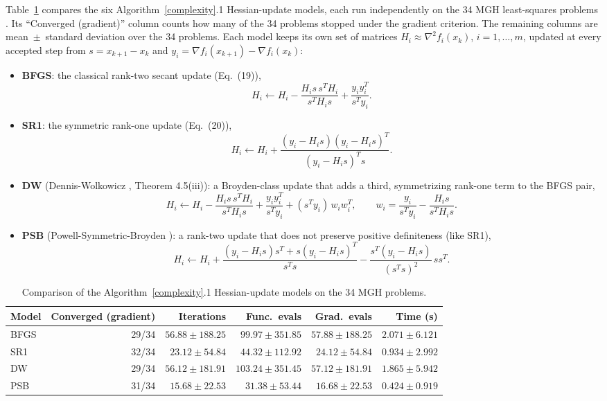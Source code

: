 \documentclass{article}
\begin{document}
Table~\ref{tab:hessian-models} compares the six Algorithm~\ref{complexity}.1 Hessian-update
models, each run independently on the 34 MGH least-squares problems
\cite{MoreGarbowHillstrom1981}. Its ``Converged (gradient)'' column counts
how many of the 34 problems stopped under the gradient criterion. The
remaining columns are mean~$\pm$~standard deviation over the 34 problems.
Each model keeps its own set of matrices $H_i \approx \nabla^2 f_i(x_k)$,
$i=1,\ldots,m$, updated at every accepted step from $s = x_{k+1}-x_k$ and
$y_i = \nabla f_i(x_{k+1}) - \nabla f_i(x_k)$:
\begin{itemize}
	\item \textbf{BFGS}: the classical rank-two secant update
	\cite{Broyden1970,Fletcher1970,Goldfarb1970,Shanno1970,NocedalWright2006} (Eq.~(19)),
	\[
	H_i \leftarrow H_i - \frac{H_i s\,s^T H_i}{s^T H_i s} + \frac{y_i y_i^T}{s^T y_i}.
	\]
	\item \textbf{SR1}: the symmetric rank-one update \cite{NocedalWright2006} (Eq.~(20)),
	\[
	H_i \leftarrow H_i + \frac{(y_i - H_i s)(y_i - H_i s)^T}{(y_i - H_i s)^T s}.
	\]
	\item \textbf{DW} (Dennis-Wolkowicz \cite{DennisWolkowicz1993}, Theorem
	4.5(iii)): a Broyden-class update that adds a third, symmetrizing
	rank-one term to the BFGS pair,
	\[
	H_i \leftarrow H_i - \frac{H_i s\,s^T H_i}{s^T H_i s} + \frac{y_i y_i^T}{s^T y_i}
	+ (s^T y_i)\, w_i w_i^T, \qquad
	w_i = \frac{y_i}{s^T y_i} - \frac{H_i s}{s^T H_i s}.
	\]
	\item \textbf{PSB} (Powell-Symmetric-Broyden \cite{Powell1970}): a
	rank-two update that does not preserve positive definiteness (like
	SR1),
	\[
	H_i \leftarrow H_i + \frac{(y_i - H_i s)s^T + s(y_i - H_i s)^T}{s^T s}
	- \frac{s^T(y_i - H_i s)}{(s^T s)^2}\, s s^T.
	\]
\end{itemize}

\begin{table}[htbp]
	\centering
	\caption{Comparison of the Algorithm~\ref{complexity}.1 Hessian-update models on the 34 MGH problems.}
	\label{tab:hessian-models}
	\begin{tabular}{l r r r r r}
		\toprule
		Model & Converged (gradient) & Iterations & Func.\ evals & Grad.\ evals & Time (s) \\
		\midrule
		BFGS & 29/34 & $56.88 \pm 188.25$ & $99.97 \pm 351.85$ & $57.88 \pm 188.25$ & $2.071 \pm 6.121$ \\
		SR1 & 32/34 & $23.12 \pm 54.84$ & $44.32 \pm 112.92$ & $24.12 \pm 54.84$ & $0.934 \pm 2.992$ \\
		DW & 29/34 & $56.12 \pm 181.91$ & $103.24 \pm 351.45$ & $57.12 \pm 181.91$ & $1.865 \pm 5.942$ \\
		PSB & 31/34 & $15.68 \pm 22.53$ & $31.38 \pm 53.44$ & $16.68 \pm 22.53$ & $0.424 \pm 0.919$ \\
		\bottomrule
	\end{tabular}
\end{table}
\end{document}
